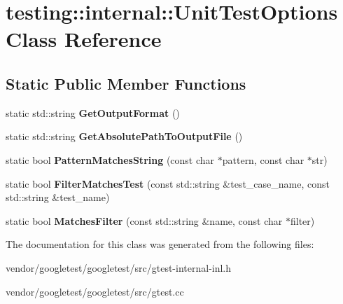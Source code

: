 \hypertarget{classtesting_1_1internal_1_1_unit_test_options}{}\section{testing\+:\+:internal\+:\+:Unit\+Test\+Options Class Reference}
\label{classtesting_1_1internal_1_1_unit_test_options}
\subsection*{Static Public Member Functions}
\begin{DoxyCompactItemize}
\item 
\mbox{\label{classtesting_1_1internal_1_1_unit_test_options_ae7413a21296d885c6924650b51ac4f6d}} 
static std\+::string {\bfseries Get\+Output\+Format} ()
\item 
\mbox{\label{classtesting_1_1internal_1_1_unit_test_options_a993fb30ad66104158c8c0ac508daca3f}} 
static std\+::string {\bfseries Get\+Absolute\+Path\+To\+Output\+File} ()
\item 
\mbox{\label{classtesting_1_1internal_1_1_unit_test_options_af0235a2ee26dd6db21305e11d2358e4f}} 
static bool {\bfseries Pattern\+Matches\+String} (const char $\ast$pattern, const char $\ast$str)
\item 
\mbox{\label{classtesting_1_1internal_1_1_unit_test_options_a9975b59cece94874b303421697e3bca6}} 
static bool {\bfseries Filter\+Matches\+Test} (const std\+::string \&test\+\_\+case\+\_\+name, const std\+::string \&test\+\_\+name)
\item 
\mbox{\label{classtesting_1_1internal_1_1_unit_test_options_a67fc0adaffbb8d320b92e42e05017e4e}} 
static bool {\bfseries Matches\+Filter} (const std\+::string \&name, const char $\ast$filter)
\end{DoxyCompactItemize}


The documentation for this class was generated from the following files\+:\begin{DoxyCompactItemize}
\item 
vendor/googletest/googletest/src/gtest-\/internal-\/inl.\+h\item 
vendor/googletest/googletest/src/gtest.\+cc\end{DoxyCompactItemize}
